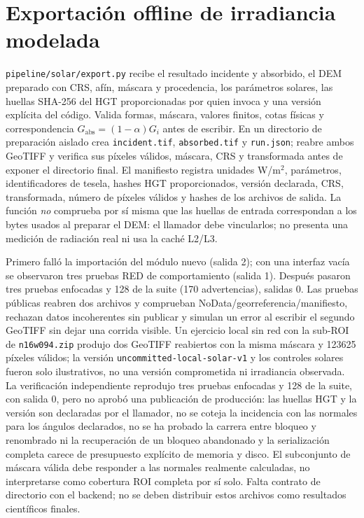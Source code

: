 \documentclass[11pt,a4paper]{article}
\begin{document}
\section{Exportación offline de irradiancia modelada}
\texttt{pipeline/solar/export.py} recibe el resultado incidente y absorbido, el DEM preparado con CRS, afín, máscara y procedencia, los parámetros solares, las huellas SHA-256 del HGT proporcionadas por quien invoca y una versión explícita del código. Valida formas, máscara, valores finitos, cotas físicas y correspondencia $G_{\mathrm{abs}}=(1-\alpha)G_i$ antes de escribir. En un directorio de preparación aislado crea \texttt{incident.tif}, \texttt{absorbed.tif} y \texttt{run.json}; reabre ambos GeoTIFF y verifica sus píxeles válidos, máscara, CRS y transformada antes de exponer el directorio final. El manifiesto registra unidades W/m$^2$, parámetros, identificadores de tesela, hashes HGT proporcionados, versión declarada, CRS, transformada, número de píxeles válidos y hashes de los archivos de salida. La función \emph{no} comprueba por sí misma que las huellas de entrada correspondan a los bytes usados al preparar el DEM: el llamador debe vincularlos; no presenta una medición de radiación real ni usa la caché L2/L3.

Primero falló la importación del módulo nuevo (salida 2); con una interfaz vacía se observaron tres pruebas RED de comportamiento (salida 1). Después pasaron tres pruebas enfocadas y 128 de la suite (170 advertencias), salidas 0. Las pruebas públicas reabren dos archivos y comprueban NoData/georreferencia/manifiesto, rechazan datos incoherentes sin publicar y simulan un error al escribir el segundo GeoTIFF sin dejar una corrida visible. Un ejercicio local sin red con la sub-ROI de \texttt{n16w094.zip} produjo dos GeoTIFF reabiertos con la misma máscara y 123625 píxeles válidos; la versión \texttt{uncommitted-local-solar-v1} y los controles solares fueron solo ilustrativos, no una versión comprometida ni irradiancia observada. La verificación independiente reprodujo tres pruebas enfocadas y 128 de la suite, con salida 0, pero no aprobó una publicación de producción: las huellas HGT y la versión son declaradas por el llamador, no se coteja la incidencia con las normales para los ángulos declarados, no se ha probado la carrera entre bloqueo y renombrado ni la recuperación de un bloqueo abandonado y la serialización completa carece de presupuesto explícito de memoria y disco. El subconjunto de máscara válida debe responder a las normales realmente calculadas, no interpretarse como cobertura ROI completa por sí solo. Falta contrato de directorio con el backend; no se deben distribuir estos archivos como resultados científicos finales.
\end{document}
